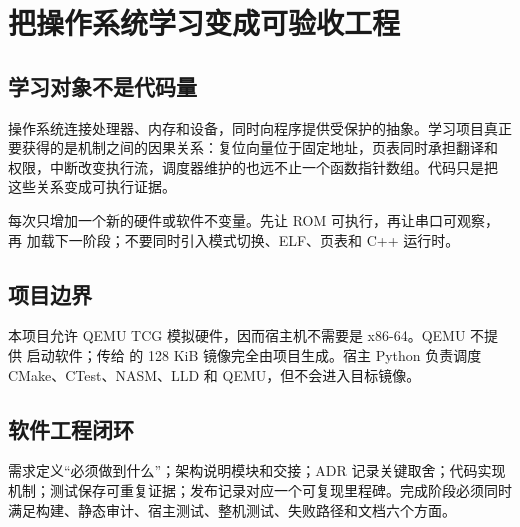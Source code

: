 \chapter{把操作系统学习变成可验收工程}

\section{学习对象不是代码量}

操作系统连接处理器、内存和设备，同时向程序提供受保护的抽象。学习项目真正
要获得的是机制之间的因果关系：复位向量位于固定地址，页表同时承担翻译和
权限，中断改变执行流，调度器维护的也远不止一个函数指针数组。代码只是把
这些关系变成可执行证据。

\begin{keyidea}
每次只增加一个新的硬件或软件不变量。先让 ROM 可执行，再让串口可观察，再
加载下一阶段；不要同时引入模式切换、ELF、页表和 C++ 运行时。
\end{keyidea}

\section{项目边界}

本项目允许 QEMU TCG 模拟硬件，因而宿主机不需要是 x86-64。QEMU 不提供
启动软件；传给  的 128 KiB 镜像完全由项目生成。宿主 Python
负责调度 CMake、CTest、NASM、LLD 和 QEMU，但不会进入目标镜像。

\begin{center}
\end{center}

\section{软件工程闭环}

需求定义“必须做到什么”；架构说明模块和交接；ADR 记录关键取舍；代码实现
机制；测试保存可重复证据；发布记录对应一个可复现里程碑。完成阶段必须同时
满足构建、静态审计、宿主测试、整机测试、失败路径和文档六个方面。

